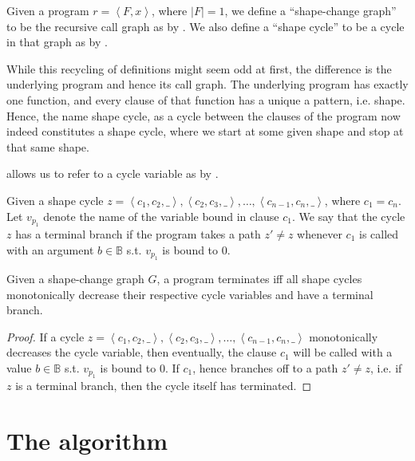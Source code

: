\begin{definition}\label{definition:nice-4} Given a program $ r = \left\langle
F, x \right\rangle$, where $|F|=1$, we define a ``shape-change graph'' to be
the recursive call graph as by . We
also define a ``shape cycle'' to be a cycle in that graph as by
.\end{definition}

While this recycling of definitions might seem odd at first, the difference is
the underlying program and hence its call graph. The underlying program has
exactly one function, and every clause of that function has a unique a pattern,
i.e. shape. Hence, the name shape cycle, as a cycle between the clauses of the
program now indeed constitutes a shape cycle, where we start at some given
shape and stop at that same shape.

 allows us to refer to a cycle variable as by
.

\begin{definition} Given a shape cycle $z= \left\langle c_1,c_2,\_
\right\rangle, \left\langle c_2,c_3,\_ \right\rangle, \ldots, \left\langle
c_{n-1}, c_n,\_ \right\rangle$, where $c_1=c_n$. Let $v_{p_1}$ denote the name
of the variable bound in clause $c_1$. We say that the cycle $z$ has a terminal
branch if the program takes a path $z'\neq z$ whenever $c_1$ is called with an
argument $b\in\mathbb{B}$ s.t. $v_{p_1}$ is bound to $0$.\end{definition}

\begin{theorem} Given a shape-change graph $G$, a program terminates iff all
shape cycles monotonically decrease their respective cycle
variables and have a terminal branch.\end{theorem}

\begin{proof} If a cycle $z= \left\langle c_1,c_2,\_ \right\rangle,
\left\langle c_2,c_3,\_ \right\rangle, \ldots, \left\langle c_{n-1}, c_n,\_
\right\rangle$ monotonically decreases the cycle variable, then eventually, the
clause $c_1$ will be called with a value $b\in\mathbb{B}$ s.t. $v_{p_1}$ is
bound to $0$. If $c_1$, hence branches off to a path $z'\neq z$, i.e. if $z$ is
a terminal branch, then the cycle itself has terminated.\end{proof}

\section{The algorithm}


